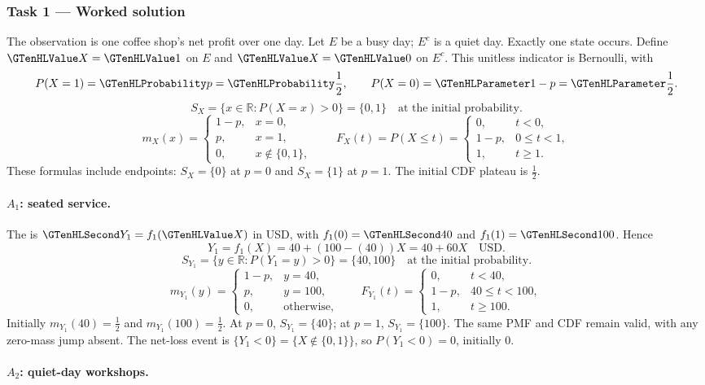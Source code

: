\subsubsection*{Task 1 --- Worked solution}\label{sol:c3-coffee-model}
The observation is one coffee shop's net profit over one day. Let $E$ be a busy day; $E^c$ is a quiet day. Exactly one state occurs. Define $\Indicator{X}=\Indicator{1}$ on $E$ and $\Indicator{X}=\Indicator{0}$ on $E^c$. This unitless indicator is Bernoulli, with
\[P(X=1)=\SuccessProb{p}=\SuccessProb{\frac{1}{2}},\qquad P(X=0)=\FailureProb{1-p}=\FailureProb{\frac{1}{2}}.\]
\[S_X=\{x\in\mathbb R:P(X=x)>0\}=\{0,1\}\quad\text{at the initial probability}.\]
\[m_X(x)=\begin{cases}1-p,&x=0,\\p,&x=1,\\0,&x\notin\{0,1\},\end{cases}\qquad F_X(t)=P(X\leq t)=\begin{cases}0,&t<0,\\1-p,&0\leq t<1,\\1,&t\geq1.\end{cases}\]
These formulas include endpoints: $S_X=\{0\}$ at $p=0$ and $S_X=\{1\}$ at $p=1$. The initial CDF plateau is $\frac{1}{2}$.
\paragraph{$A_1$: seated service.}
The  is $\Money{Y_1}=f_1(\Indicator{X})$ in USD, with $f_1(0)=\Money{40}$ and $f_1(1)=\Money{100}$. Hence
\[Y_1=f_1(X)=40+(100-(40))X=40+60X\quad\text{USD}.\]
\[S_{Y_1}=\{y\in\mathbb R:P(Y_1=y)>0\}=\{40,100\}\quad\text{at the initial probability}.\]
\[m_{Y_1}(y)=\begin{cases}1-p,&y=40,\\p,&y=100,\\0,&\text{otherwise},\end{cases}\qquad F_{Y_1}(t)=\begin{cases}0,&t<40,\\1-p,&40\leq t<100,\\1,&t\geq 100.\end{cases}\]
Initially $m_{Y_1}(40)=\frac{1}{2}$ and $m_{Y_1}(100)=\frac{1}{2}$. At $p=0$, $S_{Y_1}=\{40\}$; at $p=1$, $S_{Y_1}=\{100\}$. The same PMF and CDF remain valid, with any zero-mass jump absent.
The net-loss event is $\{Y_1<0\}=\{X\notin\{0,1\}\}$, so $P(Y_1<0)=0$, initially $0$.
\paragraph{$A_2$: quiet-day workshops.}
